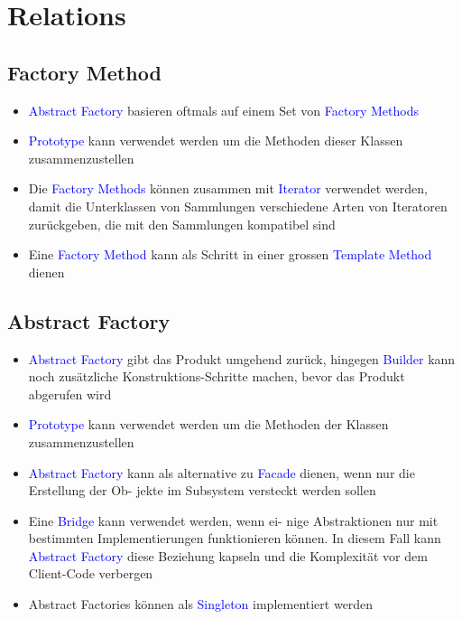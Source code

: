 \section{Relations}

\subsection{Factory Method}

\begin{itemize}
    \item \textcolor{blue}{Abstract Factory} basieren oftmals auf einem Set von \textcolor{blue}{Factory Methods}
    \item \textcolor{blue}{Prototype} kann verwendet werden um die Methoden dieser Klassen zusammenzustellen
    \item Die \textcolor{blue}{Factory Methods} können zusammen mit \textcolor{blue}{Iterator} verwendet werden, damit die Unterklassen von Sammlungen verschiedene Arten von Iteratoren zurückgeben, die mit den Sammlungen kompatibel sind
    \item Eine \textcolor{blue}{Factory Method} kann als Schritt in einer grossen \textcolor{blue}{Template Method} dienen
\end{itemize}

\subsection{Abstract Factory}

\begin{itemize}
    \item \textcolor{blue}{Abstract Factory} gibt das Produkt umgehend zurück, hingegen \textcolor{blue}{Builder} kann noch zusätzliche Konstruktions-Schritte machen, bevor das Produkt abgerufen wird
    \item \textcolor{blue}{Prototype} kann verwendet werden um die Methoden der Klassen zusammenzustellen
    \item \textcolor{blue}{Abstract Factory} kann als alternative zu \textcolor{blue}{Facade} dienen, wenn nur die Erstellung der Ob-
    jekte im Subsystem versteckt werden sollen
    \item Eine \textcolor{blue}{Bridge} kann verwendet werden, wenn ei-
    nige Abstraktionen nur mit bestimmten Implementierungen funktionieren können. In diesem Fall kann \textcolor{blue}{Abstract Factory} diese Beziehung
    kapseln und die Komplexität vor dem Client-Code verbergen
    \item Abstract Factories können als \textcolor{blue}{Singleton} implementiert werden
\end{itemize}

